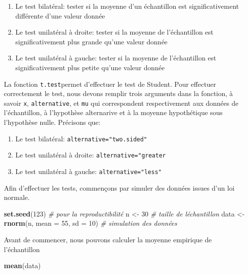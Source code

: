 \documentclass[
]{book}
\newenvironment{Shaded}{\begin{snugshade}}{\end{snugshade}}
\newcommand{\AttributeTok}[1]{\textcolor[rgb]{0.13,0.29,0.53}{#1}}
\newcommand{\CommentTok}[1]{\textcolor[rgb]{0.56,0.35,0.01}{\textit{#1}}}
\newcommand{\DecValTok}[1]{\textcolor[rgb]{0.00,0.00,0.81}{#1}}
\newcommand{\FunctionTok}[1]{\textcolor[rgb]{0.13,0.29,0.53}{\textbf{#1}}}
\newcommand{\NormalTok}[1]{#1}
\newcommand{\OtherTok}[1]{\textcolor[rgb]{0.56,0.35,0.01}{#1}}
\providecommand{\tightlist}{%
  \setlength{\itemsep}{0pt}\setlength{\parskip}{0pt}}
\begin{document}
\begin{enumerate}
\def\labelenumi{\arabic{enumi}.}
\tightlist
\item
  Le test bilatéral: tester si la moyenne d'un échantillon est significativement différente d'une valeur donnée
\item
  Le test unilatéral à droite: tester si la moyenne de l'échantillon est significativement plus grande qu'une valeur donnée
\item
  Le test unilatéral à gauche: tester si la moyenne de l'échantillon est significativement plus petite qu'une valeur donnée
\end{enumerate}

La fonction \texttt{t.test}permet d'effectuer le test de Student. Pour effectuer correctement le test, nous devons remplir trois arguments dans la fonction, à savoir \texttt{x}, \texttt{alternative}, et \texttt{mu} qui correspondent respectivement aux données de l'échantillon, à l'hypothèse alternarive et à la moyenne hypothétique sous l'hypothèse nulle. Précisons que:

\begin{enumerate}
\def\labelenumi{\arabic{enumi}.}
\tightlist
\item
  Le test bilatéral: \texttt{alternative="two.sided"}
\item
  Le test unilatéral à droite: \texttt{alternative="greater}
\item
  Le test unilatéral à gauche: \texttt{alternative="less"}
\end{enumerate}

Afin d'effectuer les tests, commençons par simuler des données issues d'un loi normale.

\begin{Shaded}
\begin{Highlighting}[]
\FunctionTok{set.seed}\NormalTok{(}\DecValTok{123}\NormalTok{)  }\CommentTok{\# pour la reproductibilité}
\NormalTok{n }\OtherTok{\textless{}{-}} \DecValTok{30}  \CommentTok{\# taille de l\textquotesingle{}échantillon}
\NormalTok{data }\OtherTok{\textless{}{-}} \FunctionTok{rnorm}\NormalTok{(n, }\AttributeTok{mean =} \DecValTok{55}\NormalTok{, }\AttributeTok{sd =} \DecValTok{10}\NormalTok{)  }\CommentTok{\# simulation des données }
\end{Highlighting}
\end{Shaded}

Avant de commencer, nous pouvons calculer la moyenne empirique de l'échantillon

\begin{Shaded}
\begin{Highlighting}[]
\FunctionTok{mean}\NormalTok{(data)}
\end{Highlighting}
\end{Shaded}
\end{document}
